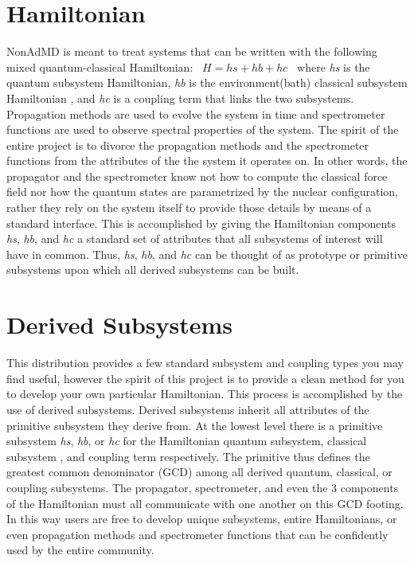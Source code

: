 \hypertarget{_overview_Hamiltonian}{}\section{Hamiltonian}\label{_overview_Hamiltonian}
Non\+Ad\+MD is meant to treat systems that can be written with the following mixed quantum-\/classical Hamiltonian\+:~\newline
 $H=hs+hb+hc$~\newline
where {\itshape hs} is the quantum subsystem Hamiltonian, {\itshape hb} is the environment(bath) classical subsystem Hamiltonian , and {\itshape hc} is a coupling term that links the two subsystems. Propagation methods are used to evolve the system in time and spectrometer functions are used to observe spectral properties of the system. The spirit of the entire project is to divorce the propagation methods and the spectrometer functions from the attributes of the the system it operates on. In other words, the propagator and the spectrometer know not how to compute the classical force field nor how the quantum states are parametrized by the nuclear configuration, rather they rely on the system itself to provide those details by means of a standard interface. This is accomplished by giving the Hamiltonian components {\itshape hs}, {\itshape hb}, and {\itshape hc} a standard set of attributes that all subsystems of interest will have in common. Thus, {\itshape hs}, {\itshape hb}, and {\itshape hc} can be thought of as prototype or primitive subsystems upon which all derived subsystems can be built.\hypertarget{_overview_Derived_Subsystems}{}\section{Derived Subsystems}\label{_overview_Derived_Subsystems}
This distribution provides a few standard subsystem and coupling types you may find useful, however the spirit of this project is to provide a clean method for you to develop your own particular Hamiltonian. This process is accomplished by the use of derived subsystems. Derived subsystems inherit all attributes of the primitive subsystem they derive from. At the lowest level there is a primitive subsystem {\itshape hs}, {\itshape hb}, or {\itshape hc} for the Hamiltonian quantum subsystem, classical subsystem , and coupling term respectively. The primitive thus defines the greatest common denominator (G\+CD) among all derived quantum, classical, or coupling subsystems. The propagator, spectrometer, and even the 3 components of the Hamiltonian must all communicate with one another on this G\+CD footing. In this way users are free to develop unique subsystems, entire Hamiltonians, or even propagation methods and spectrometer functions that can be confidently used by the entire community.

